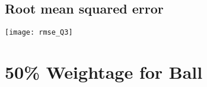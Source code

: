 \documentclass[a4paper, 12pt]{article}
\begin{document}
\subsection{Root mean squared error}

\begin{center}
\begin{minipage}{0.7\linewidth}
    \texttt{[image: rmse\_Q3]}
    \label{fig:Q1_3}
\end{minipage}
\end{center}


\section{50\% Weightage for Ball}
\end{document}
